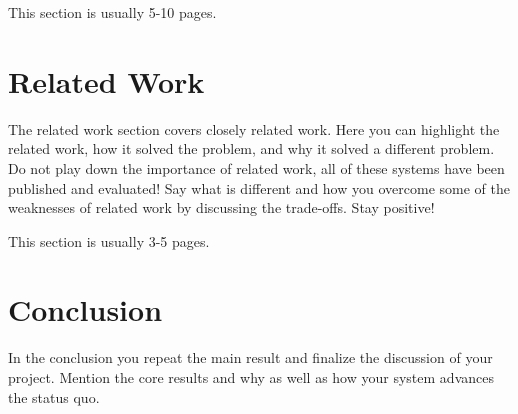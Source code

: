 \documentclass[a4paper,12pt,oneside]{report}
\begin{document}
This section is usually 5-10 pages.


\chapter{Related Work}

The related work section covers closely related work. Here you can highlight
the related work, how it solved the problem, and why it solved a different
problem. Do not play down the importance of related work, all of these
systems have been published and evaluated! Say what is different and how
you overcome some of the weaknesses of related work by discussing the 
trade-offs. Stay positive!

This section is usually 3-5 pages.


\chapter{Conclusion}

In the conclusion you repeat the main result and finalize the discussion of
your project. Mention the core results and why as well as how your system
advances the status quo.

\cleardoublepage
{}
{}
\printbibliography

%
%
\end{document}

